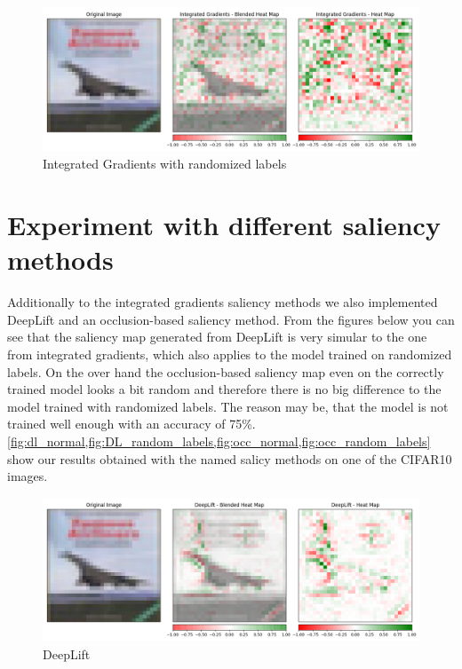 \documentclass{article}
\begin{document}
\begin{figure}[h!]
\centering
\includegraphics[width=\textwidth]{results/IG_random_labels.png}
\caption{Integrated Gradients with randomized labels}
\label{fig:ig_random_labels}
\end{figure}

\clearpage



\section{Experiment with different saliency methods}
Additionally to the integrated gradients saliency methods we also implemented DeepLift and an occlusion-based saliency method. From the figures below you can see that the saliency map generated from DeepLift is very simular to the one from integrated gradients, which also applies to the model trained on randomized labels. On the over hand the occlusion-based saliency map even on the correctly trained model looks a bit random and therefore there is no big difference to the model trained with randomized labels. The reason may be, that the model is not trained well enough with an accuracy of 75\%.\\

\cref{fig:dl_normal,fig:DL_random_labels,fig:occ_normal,fig:occ_random_labels} show our results obtained with the named salicy methods on one of the CIFAR10 images.

\begin{figure}[h!]
\centering
\includegraphics[width=\textwidth]{results/DL_normal.png}
\caption{DeepLift}
\label{fig:dl_normal}
\end{figure}
\end{document}

